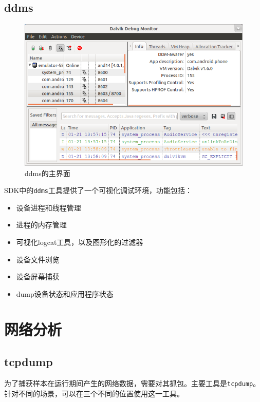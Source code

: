 \subsection{ddms}
\begin{figure}[htbp]
  \centering
  \includegraphics[width=14cm]{image/ddms.png}
  \caption{ddms的主界面}
\end{figure}
SDK中的\lstinline!ddms!工具提供了一个可视化调试环境，功能包括：
\begin{itemize}
  \item 设备进程和线程管理
  \item 进程的内存管理
  \item 可视化logcat工具，以及图形化的过滤器
  \item 设备文件浏览
  \item 设备屏幕捕获
  \item dump设备状态和应用程序状态
\end{itemize}

\section{网络分析}
\subsection{tcpdump}
为了捕获样本在运行期间产生的网络数据，需要对其抓包。主要工具是\lstinline!tcpdump!。针对不同的场景，可以在三个不同的位置使用这一工具。

